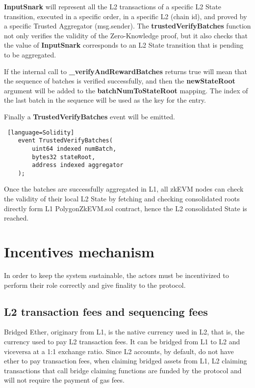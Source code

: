 \textbf{InputSnark} will represent all the L2 transactions of a specific L2 State transition, executed in a specific order, in a specific L2 (chain id), and proved by a specific Trusted Aggregator (msg.sender). The \textbf{trustedVerifyBatches} function not only verifies the validity of the Zero-Knowledge proof, but it also checks that the value of \textbf{InputSnark} corresponds to an L2 State transition that is pending to be aggregated.

If the internal call to \textbf{\_verifyAndRewardBatches} returns true will mean that the sequence of batches is verified successfully, and then the \textbf{newStateRoot} argument will be added to the \textbf{batchNumToStateRoot} mapping. The index of the last batch in the sequence will be used as the key for the entry.

Finally a \textbf{TrustedVerifyBatches} event will be emitted.


\begin{lstlisting} [language=Solidity]
	event TrustedVerifyBatches(
		uint64 indexed numBatch,
		bytes32 stateRoot,
		address indexed aggregator
	);
\end{lstlisting}

Once the batches are successfully aggregated in L1, all zkEVM nodes can check the validity of  their local L2 State by fetching and checking consolidated roots directly form L1 PolygonZkEVM.sol contract, hence the L2 consolidated State is reached.
 
 
\section{Incentives mechanism}

In order to keep the system sustainable, the actors must be incentivized to perform their role correctly and give finality to the protocol.

\subsection{L2 transaction fees and sequencing fees} 
Bridged Ether, originary from L1, is the native currency used in L2, that is, the currency used to pay L2 transaction fees. It can be bridged from L1 to L2 and viceversa at a 1:1 exchange ratio. Since L2 accounts, by default, do not have ether to pay transaction fees, when claiming bridged assets from L1, L2 claiming transactions that call bridge claiming functions are funded by the protocol and will not require the payment of gas fees.

